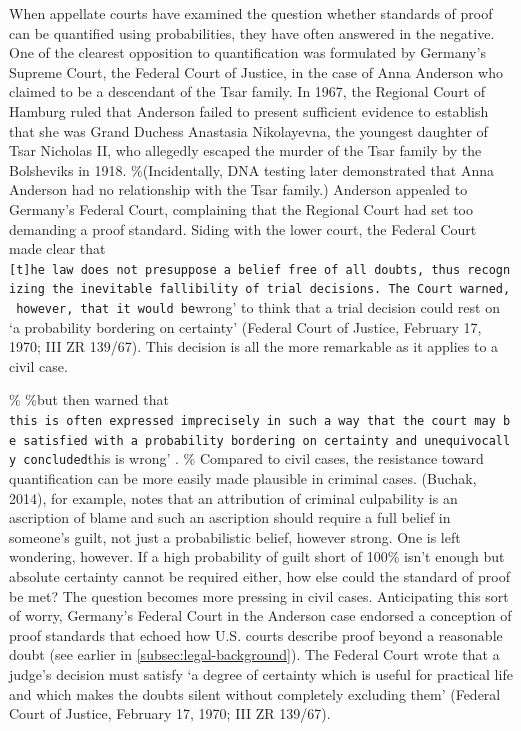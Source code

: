 \documentclass[10pt,dvipsnames]{scrartcl}
\begin{document}
When appellate courts have examined the question whether standards of
proof can be quantified using probabilities, they have often answered in
the negative. One of the clearest opposition to quantification was
formulated by Germany's Supreme Court, the Federal Court of Justice, in
the case of Anna Anderson who claimed to be a descendant of the Tsar
family. In 1967, the Regional Court of Hamburg ruled that Anderson
failed to present sufficient evidence to establish that she was Grand
Duchess Anastasia Nikolayevna, the youngest daughter of Tsar Nicholas
II, who allegedly escaped the murder of the Tsar family by the
Bolsheviks in 1918. \%(Incidentally, DNA testing later demonstrated that
Anna Anderson had no relationship with the Tsar family.) Anderson
appealed to Germany's Federal Court, complaining that the Regional Court
had set too demanding a proof standard. Siding with the lower court, the
Federal Court made clear that
\texttt{{[}t{]}he\ law\ does\ not\ presuppose\ a\ belief\ free\ of\ all\ doubts\textquotesingle{},\ thus\ recognizing\ the\ inevitable\ fallibility\ of\ trial\ decisions.\ The\ Court\ warned,\ however,\ that\ it\ would\ be}wrong'
to think that a trial decision could rest on `a probability bordering on
certainty' (Federal Court of Justice, February 17, 1970; III ZR 139/67).
This decision is all the more remarkable as it applies to a civil case.

\% \%but then warned that
\texttt{this\ is\ often\ expressed\ imprecisely\ in\ such\ a\ way\ that\ the\ court\ may\ be\ satisfied\ with\ a\ probability\ bordering\ on\ certainty\textquotesingle{}\ and\ unequivocally\ concluded}this
is wrong' . \% Compared to civil cases, the resistance toward
quantification can be more easily made plausible in criminal cases.
(Buchak, 2014), for example, notes that an attribution of criminal
culpability is an ascription of blame and such an ascription should
require a full belief in someone's guilt, not just a probabilistic
belief, however strong. One is left wondering, however. If a high
probability of guilt short of 100\% isn't enough but absolute certainty
cannot be required either, how else could the standard of proof be met?
The question becomes more pressing in civil cases. Anticipating this
sort of worry, Germany's Federal Court in the Anderson case endorsed a
conception of proof standards that echoed how U.S. courts describe proof
beyond a reasonable doubt (see earlier in
\ref{subsec:legal-background}). The Federal Court wrote that a judge's
decision must satisfy `a degree of certainty which is useful for
practical life and which makes the doubts silent without completely
excluding them' (Federal Court of Justice, February 17, 1970; III ZR
139/67).
\end{document}

